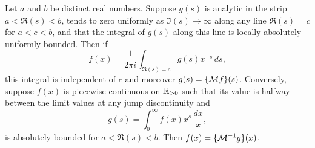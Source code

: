       \begin{theorem}
        Let $a$ and $b$ be distinct real numbers. Suppose $g(s)$ is analytic in the strip $a < \Re(s) < b$, tends to zero uniformly as $\Im(s) \to \infty$ along any line $\Re(s) = c$ for $a < c < b$, and that the integral of $g(s)$ along this line is locally absolutely uniformly bounded. Then if
        \[
          f(x) = \frac{1}{2\pi i}\int_{\Re(s) = c}g(s)x^{-s}\,ds,
        \]
        this integral is independent of $c$ and moreover $g(s) = \{\mathcal{M}f\}(s)$. Conversely, suppose $f(x)$ is piecewise continuous on $\mathbb{R}_{>0}$ such that its value is halfway between the limit values at any jump discontinuity and
        \[
          g(s) = \int_{0}^{\infty}f(x)x^{s}\,\frac{dx}{x},
        \]
        is absolutely bounded for $a < \Re(s) < b$. Then $f(x) = \{\mathcal{M}^{-1}g\}(x)$.
      \end{theorem}
